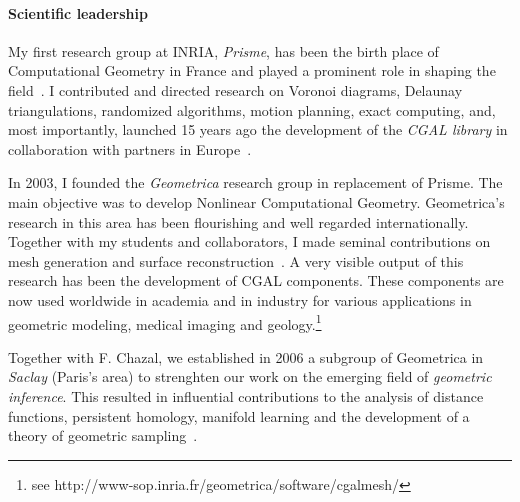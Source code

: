 
\paragraph{Scientific leadership} \mbox{}


My first research group at INRIA, {\em Prisme}, has been the birth place of Computational Geometry in France and played a prominent role in shaping the field~\cite{by-ag-98}. 
I contributed and directed research on Voronoi diagrams, Delaunay triangulations, randomized algorithms, motion planning, exact computing, and, most importantly, launched 15 years ago the development of the {\em CGAL library} in collaboration with partners in Europe~\cite{cgal}.

In 2003, I founded the {\em Geometrica} research group in replacement of Prisme. The main objective was to develop Nonlinear Computational Geometry. 
 Geometrica's research in this area has been flourishing and well regarded internationally. Together with my students and collaborators, I made seminal contributions on mesh generation and surface reconstruction~\cite{geometrica-ecg-book}. A very visible output of this research has been the development of CGAL components. These components are now used worldwide in academia and in industry for various applications in geometric modeling, medical imaging and geology.\footnote{see http://www-sop.inria.fr/geometrica/software/cgalmesh/}

Together with F. Chazal, we established in 2006 a subgroup of Geometrica in {\em Saclay} (Paris's area)  to strenghten our work on  the emerging field of {\em geometric inference}.  This resulted in influential contributions to the analysis of distance functions, persistent homology, manifold learning and the development of a theory of geometric sampling~\cite{geometrica-bgo-09,geometrica-ccl09}.
\newpage


